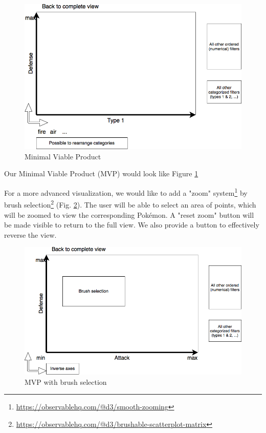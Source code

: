 \documentclass[10pt,conference,compsocconf]{IEEEtran}
\begin{document}
\begin{figure}[!ht]
  \includegraphics[scale=0.4]{img/2_3.png}
  \caption{Minimal Viable Product}
  \label{fig:mvp}
\end{figure}

Our Minimal Viable Product (MVP) would look like Figure \ref{fig:mvp}


For a more advanced visualization, we would like to add a "zoom" system\footnote{\url{https://observablehq.com/@d3/smooth-zooming}} by brush selection\footnote{\url{https://observablehq.com/@d3/brushable-scatterplot-matrix}} (Fig. \ref{fig:mvp_brush}). The user will be able to select an area of points, which will be zoomed to view the corresponding Pokémon. A "reset zoom" button will be made visible to return to the full view. We also provide a button to effectively reverse the view.

\begin{figure}[!ht]
  \includegraphics[scale=0.4]{img/2_1.png}
  \caption{MVP with brush selection}
  \label{fig:mvp_brush}
\end{figure}
\end{document}
